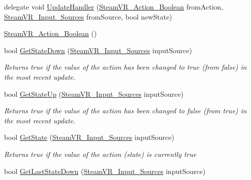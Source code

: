 \begin{DoxyCompactItemize}
\item 
delegate void \mbox{\hyperlink{class_valve_1_1_v_r_1_1_steam_v_r___action___boolean_ab9ee21a88a5d5d23603465c55796fcf5}{Update\+Handler}} (\mbox{\hyperlink{class_valve_1_1_v_r_1_1_steam_v_r___action___boolean}{Steam\+V\+R\+\_\+\+Action\+\_\+\+Boolean}} from\+Action, \mbox{\hyperlink{namespace_valve_1_1_v_r_a82e5bf501cc3aa155444ee3f0662853f}{Steam\+V\+R\+\_\+\+Input\+\_\+\+Sources}} from\+Source, bool new\+State)
\item 
\mbox{\hyperlink{class_valve_1_1_v_r_1_1_steam_v_r___action___boolean_a13dc81923871ae6d319c93a7df9e4e9d}{Steam\+V\+R\+\_\+\+Action\+\_\+\+Boolean}} ()
\item 
bool \mbox{\hyperlink{class_valve_1_1_v_r_1_1_steam_v_r___action___boolean_aa0a7eb5f7e02e35fd6922dd30b087f77}{Get\+State\+Down}} (\mbox{\hyperlink{namespace_valve_1_1_v_r_a82e5bf501cc3aa155444ee3f0662853f}{Steam\+V\+R\+\_\+\+Input\+\_\+\+Sources}} input\+Source)
\begin{DoxyCompactList}\small\item\em Returns true if the value of the action has been changed to true (from false) in the most recent update. \end{DoxyCompactList}\item 
bool \mbox{\hyperlink{class_valve_1_1_v_r_1_1_steam_v_r___action___boolean_a4b582272fb4f9c529e519246332e9922}{Get\+State\+Up}} (\mbox{\hyperlink{namespace_valve_1_1_v_r_a82e5bf501cc3aa155444ee3f0662853f}{Steam\+V\+R\+\_\+\+Input\+\_\+\+Sources}} input\+Source)
\begin{DoxyCompactList}\small\item\em Returns true if the value of the action has been changed to false (from true) in the most recent update. \end{DoxyCompactList}\item 
bool \mbox{\hyperlink{class_valve_1_1_v_r_1_1_steam_v_r___action___boolean_a189859c4e3670a461d15e63e9fca059b}{Get\+State}} (\mbox{\hyperlink{namespace_valve_1_1_v_r_a82e5bf501cc3aa155444ee3f0662853f}{Steam\+V\+R\+\_\+\+Input\+\_\+\+Sources}} input\+Source)
\begin{DoxyCompactList}\small\item\em Returns true if the value of the action (state) is currently true \end{DoxyCompactList}\item 
bool \mbox{\hyperlink{class_valve_1_1_v_r_1_1_steam_v_r___action___boolean_a3e90d2e15de3161ebb4a81a2359d107b}{Get\+Last\+State\+Down}} (\mbox{\hyperlink{namespace_valve_1_1_v_r_a82e5bf501cc3aa155444ee3f0662853f}{Steam\+V\+R\+\_\+\+Input\+\_\+\+Sources}} input\+Source)

\end{DoxyCompactItemize}
